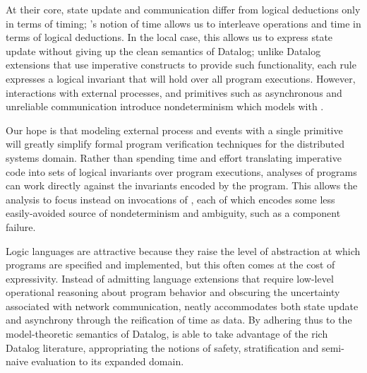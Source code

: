 
At their core, state update and communication differ from logical
deductions only in terms of timing; \lang's notion of time allows us
to interleave operations and time in terms of logical deductions.
In the local case, this allows us to express state update without giving up the clean semantics of Datalog; unlike
Datalog extensions that use imperative constructs to provide such
functionality, each \lang rule expresses a logical invariant that will
hold over all program executions.  
However, interactions with external processes, and primitives such as
asynchronous and unreliable communication introduce nondeterminism
which \lang models with .  

Our hope is that modeling external process and events with a single
primitive will greatly simplify formal program verification techniques for the distributed systems domain.  Rather
than spending time and effort translating imperative code into sets of logical
invariants over program executions, analyses of \lang programs can
work directly against the invariants encoded by the program.  This  allows
the analysis to focus instead on invocations of , each of which
encodes some less easily-avoided source of nondeterminism and
ambiguity, such as a component failure.

Logic languages are attractive because they raise the level of abstraction at which programs are specified
and implemented, but this often comes at the cost of expressivity.  Instead of admitting language extensions that require low-level 
operational reasoning about program behavior and obscuring the uncertainty associated with network communication, \lang 
neatly accommodates both state update and asynchrony through the reification of time as data.  By adhering thus to the model-theoretic
semantics of Datalog, \lang is able to take advantage of the rich Datalog literature, appropriating the notions of safety, stratification
and semi-naive evaluation to its expanded domain.  




